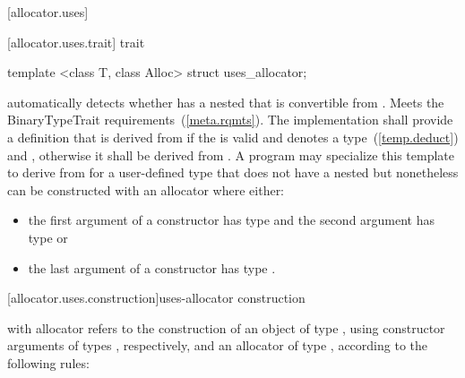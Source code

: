 [allocator.uses]{}

[allocator.uses.trait]{ trait}

%
\begin{itemdecl}
template <class T, class Alloc> struct uses_allocator;
\end{itemdecl}

\begin{itemdescr}
\pnum
\remarks automatically detects whether  has a nested  that
is convertible from . Meets the BinaryTypeTrait
requirements~(\ref{meta.rqmts}). The implementation shall provide a definition that is
derived from  if the  
is valid and denotes a type~(\ref{temp.deduct}) and
, otherwise it shall be
derived from . A program may specialize this template to derive from
 for a user-defined type  that does not have a nested
 but nonetheless can be constructed with an allocator where
either:

\begin{itemize}
\item the first argument of a constructor has type  and the
second argument has type  or

\item the last argument of a constructor has type .
\end{itemize}
\end{itemdescr}

[allocator.uses.construction]{uses-allocator construction}

\pnum
{} with allocator  refers to the
construction of an object  of type , using constructor arguments
 of types , respectively, and an allocator
 of type , according to the following rules:

